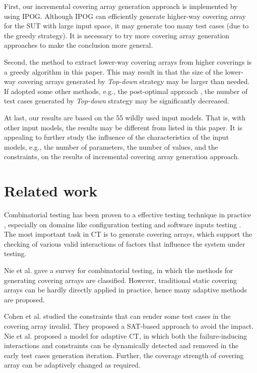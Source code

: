 \documentclass[conference]{IEEEtran}
\theoremstyle{definition}
\begin{document}
First, our incremental covering array generation approach is implemented by using IPOG. Although IPOG can efficiently generate higher-way covering array for the SUT with large input space, it may generate too many test cases (due to the greedy strategy). It is necessary to try more covering array generation approaches to make the conclusion more general.

Second, the method to extract lower-way covering arrays from higher coverings is a greedy algorithm in this paper. This may result in that the size of the lower-way covering arrays generated by \emph{Top-down} strategy may be larger than needed. If adopted some other methods, e.g., the post-optimal approach \cite{li2014refining,nayeri2013randomized}, the number of test cases generated by \emph{Top-down} strategy may be significantly decreased.

At last, our results are based on the 55 wildly used input models. That is, with other input models, the results may be different from listed in this paper. It is appealing to further study the influence of the characteristics of the input models, e.g., the number of parameters, the number of values, and the constraints, on the results of incremental covering array generation approach.

\section{Related work}

Combinatorial testing has been proven to a effective testing technique in practice \cite{kuhn2010practical}, especially on domains like configuration testing \cite{yilmaz2006covering,cohen2006testing,qu2008configuration} and software inputs testing \cite{cohen1997aetg,borazjany2012combinatorial,ghandehari2013applying}. The most important task in CT is to generate covering arrays, which support the checking of various valid interactions of factors that influence the system under testing.

Nie et al. \cite{nie2011survey} gave a survey for combinatorial testing, in which the methods for generating covering
arrays are classified. However, traditional static covering arrays can be hardly directly applied in practice, hence many adaptive methods are proposed.

Cohen et al. \cite{cohen2007exploiting,cohen2008constructing} studied the constraints that can render some test cases in the covering array invalid. They proposed a SAT-based approach to avoid the impact.
Nie et al.\cite{nie2013adaptive} proposed a model for adaptive CT, in which both the failure-inducing interactions and constraints can be dynamically detected and removed in the early test cases generation iteration. Further, the coverage strength of covering array can be adaptively changed as required.
\end{document}
